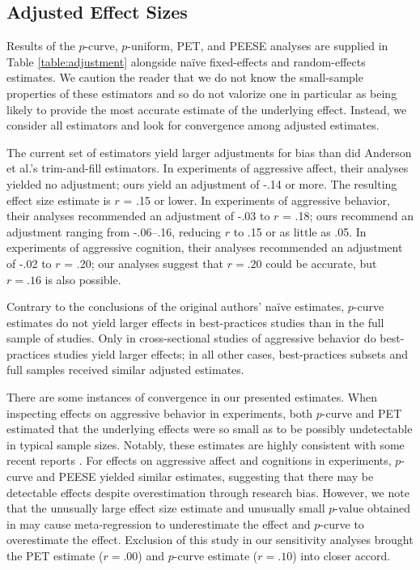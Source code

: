 \documentclass[man, mask]{apa6}
\begin{document}
\subsection{Adjusted Effect Sizes}
Results of the $p$-curve, $p$-uniform, PET, and PEESE analyses are supplied in Table \ref{table:adjustment} alongside na{\"i}ve fixed-effects and random-effects estimates. We caution the reader that we do not know the small-sample properties of these estimators and so do not valorize one in particular as being likely to provide the most accurate estimate of the underlying effect. Instead, we consider all estimators and look for convergence among adjusted estimates.

The current set of estimators yield larger adjustments for bias than did Anderson et al.'s trim-and-fill estimators.  In experiments of aggressive affect, their analyses yielded no adjustment; ours yield an adjustment of -.14 or more.  The resulting effect size estimate is $r$ = .15 or lower. In experiments of aggressive behavior, their analyses recommended an adjustment of -.03 to $r$ = .18; ours recommend an adjustment ranging from -.06--.16, reducing $r$ to .15 or as little as .05. In experiments of aggressive cognition, their analyses recommended an adjustment of -.02 to $r$ = .20; our analyses suggest that $r = .20$ could be accurate, but $r = .16$ is also possible.   

Contrary to the conclusions of the original authors' na{\"i}ve estimates, $p$-curve estimates do not yield larger effects in best-practices studies than in the full sample of studies. Only in cross-sectional studies of aggressive behavior do best-practices studies yield larger effects; in all other cases, best-practices subsets and full samples received similar adjusted estimates. 

There are some instances of convergence in our presented estimates. When inspecting effects on aggressive behavior in experiments, both $p$-curve and PET estimated that the underlying effects were so small as to be possibly undetectable in typical sample sizes. Notably, these estimates are highly consistent with some recent reports \citep{Engelhardt:etal:2015,Kneer:etal:inpress,Tear:Nielsen:2014,Przybylski:etal:2014}. For effects on aggressive affect and cognitions in experiments, $p$-curve and PEESE yielded similar estimates, suggesting that there may be detectable effects despite overestimation through research bias. However, we note that the unusually large effect size estimate and unusually small $p$-value obtained in \citet{Ballard:Wiest:1996} may cause meta-regression to underestimate the effect and $p$-curve to overestimate the effect. Exclusion of this study in our sensitivity analyses brought the PET estimate ($r = .00$) and $p$-curve estimate ($r = .10$) into closer accord.
\end{document}
